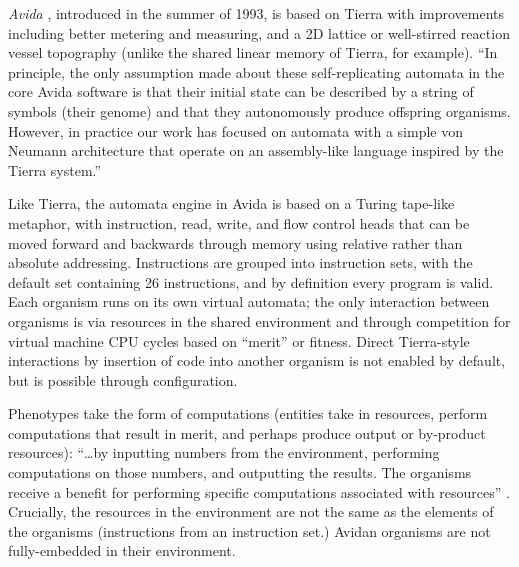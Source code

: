 \emph{Avida} \parencite{Ofria2004}, introduced in the summer of 1993, is based on Tierra with improvements including better metering and measuring, and a 2D lattice or well-stirred reaction vessel topography (unlike the shared linear memory of Tierra, for example). ``In principle, the only assumption made about these self-replicating automata in the core Avida software is that their initial state can be described by a string of symbols (their genome) and that they autonomously produce offspring organisms. However, in practice our work has focused on automata with a simple von Neumann architecture that operate on an assembly-like language inspired by the Tierra system.''

Like Tierra, the automata engine in Avida is based on a Turing tape-like metaphor, with instruction, read, write, and flow control heads that can be moved forward and backwards through memory using relative rather than absolute addressing. Instructions are grouped into instruction sets, with the default set containing 26 instructions, and by definition every program is valid. Each organism runs on its own virtual automata; the only interaction between organisms is via resources in the shared environment and through competition for virtual machine CPU cycles based on ``merit'' or fitness. Direct Tierra-style interactions by insertion of code into another organism is not enabled by default, but is possible through configuration. 

Phenotypes take the form of computations (entities take in resources, perform computations that result in merit, and perhaps produce output or by-product resources): ``\ldots by inputting numbers from the environment, performing computations on those numbers, and outputting the results. The organisms receive a benefit for performing specific computations associated with resources'' \parencite{Ofria2004}. Crucially, the resources in the environment are not the same as the elements of the organisms (instructions from an instruction set.) Avidan organisms are not fully-embedded in their environment.

